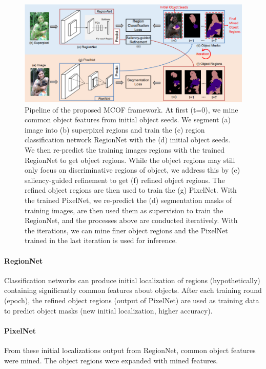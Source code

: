 \documentclass{article}
\begin{document}
\begin{figure}[ht]
	\centering
	\includegraphics[width=\textwidth]{ref3_image}
	\caption{Pipeline of the proposed MCOF framework. At first (t=0), we mine common object features from initial object seeds. We segment (a) image into (b) superpixel regions and train the (c) region classification network RegionNet with the (d) initial object seeds. We then re-predict the training images regions with the trained RegionNet to get object regions. While the object regions may still only focus on discriminative regions of object, we address this by (e) saliency-guided refinement to get (f) refined object regions. The refined object regions are then used to train the (g) PixelNet. With the trained PixelNet, we re-predict the (d) segmentation masks of training images, are then used them as supervision to train the RegionNet, and the processes above are conducted iteratively. With the iterations, we can mine finer object regions and the PixelNet trained in the last iteration is used for inference. \cite{Wang2018WeaklySupervisedSS}}
	\label{fig:ref3}
\end{figure}

\paragraph{RegionNet}
Classification networks can produce initial localization of regions (hypothetically) containing significantly common features about objects. After each training round (epoch), the refined object regions (output of PixelNet) are used as training data to predict object masks (new initial localization, higher accuracy).

\paragraph{PixelNet}
From these initial localizations output from RegionNet, common object features were mined. The object regions were expanded with mined features. 
\end{document}

